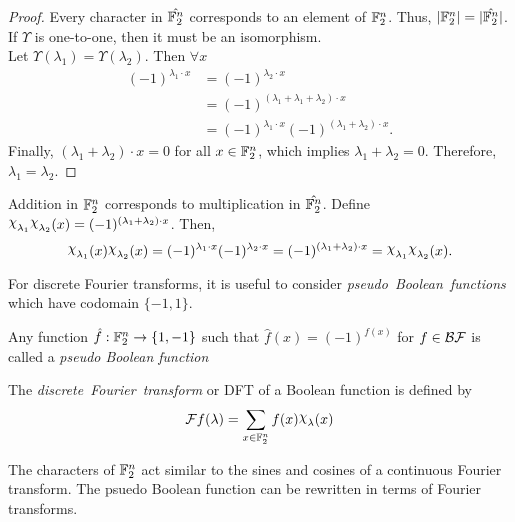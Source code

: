 \begin{proof}
	Every character in $\hat{\mathbb{F}_2^n}$ corresponds to an element of
  $\mathbb{F}_2^n$. Thus, $\lvert\mathbb{F}_2^n\rvert=\lvert\hat{\mathbb{F}_2^n}\rvert$. If
  $\Upsilon$ is one-to-one, then
	it must be an isomorphism.\\
	Let $\Upsilon(\lambda_1)=\Upsilon(\lambda_2)$. Then $\forall x$
	\begin{align*}
		(-1)^{\lambda_1\cdot x}
      &=(-1)^{\lambda_2\cdot x}\\
		  &=(-1)^{(\lambda_1+\lambda_1+\lambda_2)\cdot x}\\
      &=(-1)^{\lambda_1\cdot x}(-1)^{(\lambda_1+\lambda_2)\cdot x}.
	\end{align*}
	Finally, $(\lambda_1+\lambda_2)\cdot x=0$ for all $x\in\mathbb{F}_2^n$, which
  implies $\lambda_1+\lambda_2=0$. Therefore, $\lambda_1=\lambda_2$.
\end{proof}

\par Addition in $\mathbb{F}_2^n$ corresponds to multiplication in
$\hat{\mathbb{F}_2^n}$. Define
$\Chi_{\lambda_1}\Chi_{\lambda_2}(x)=(-1)^{(\lambda_1+\lambda_2)\cdot x}$.
Then,
\[
\Chi_{\lambda_1}(x)\Chi_{\lambda_2}(x)
  =(-1)^{\lambda_1\cdot x}(-1)^{\lambda_2\cdot x}
  =(-1)^{(\lambda_1+\lambda_2)\cdot x}
  =\Chi_{\lambda_1}\Chi_{\lambda_2}(x).
\]

\par For discrete Fourier transforms, it is useful to consider {\em pseudo\ 
Boolean\ functions}
which have codomain $\{-1,1\}$. 

\begin{definition}\label{def:pBF}
	Any function $\hat{f}:\mathbb{F}_2^n\rightarrow\{1,-1\}$ such that
  $\hat{f}(x)=(-1)^{f(x)}$ for $f\in\mathcal{BF}$ is called a {\em pseudo Boolean
  function}
\end{definition}

\begin{definition}\label{def:DFT}
	The {\em discrete\ Fourier\ transform} or DFT of a Boolean function is
  defined by
	\begin{equation}\label{eqn:DFT}
    \mathcal{F}f(\lambda)
      =\sum_{x\in\gftwo^n}f(x)\Chi_\lambda(x)
	\end{equation}
\end{definition}

\par The characters of $\mathbb{F}_2^n$ act similar to the sines and cosines of a
continuous Fourier transform. The psuedo Boolean function can be rewritten
in terms of Fourier transforms.

